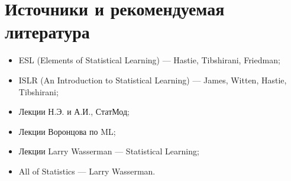 \documentclass[12pt,a4paper,final]{article}
\newcommand{\1}{\mathds{1}}
\begin{document}
\section{Источники и рекомендуемая литература}

\begin{itemize}
	\item ESL (Elements of Statistical Learning) --- Hastie, Tibshirani, Friedman;
	\item ISLR (An Introduction to Statistical Learning) --- James, Witten, Hastie, Tibshirani;
	\item Лекции Н.Э. и А.И., СтатМод;
	\item Лекции Воронцова по ML;
	\item Лекции Larry Wasserman --- Statistical Learning;
	\item All of Statistics --- Larry Wasserman.
		\end{itemize}
\end{document}
